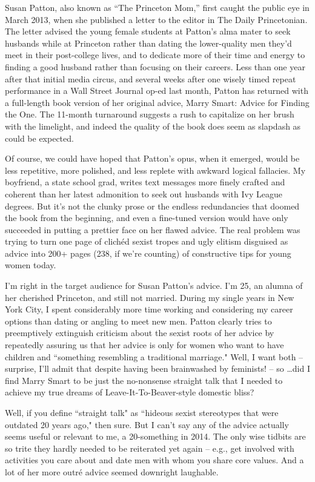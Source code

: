 \bigskip
\begin{linenumbers}
\modulolinenumbers[5]
Susan Patton, also known as “The Princeton Mom,” first caught the public eye in March 2013, when she published a letter to the editor in The Daily Princetonian. The letter advised the young female students at Patton's alma mater to seek husbands while at Princeton rather than dating the lower-quality men they'd meet in their post-college lives, and to dedicate more of their time and energy to finding a good husband rather than focusing on their careers. Less than one year after that initial media circus, and several weeks after one wisely timed repeat performance in a Wall Street Journal op-ed last month, Patton has returned with a full-length book version of her original advice, Marry Smart: Advice for Finding the One. The 11-month turnaround suggests a rush to capitalize on her brush with the limelight, and indeed the quality of the book does seem as slapdash as could be expected.

\indent Of course, we could have hoped that Patton's opus, when it emerged, would be less repetitive, more polished, and less replete with awkward logical fallacies. My boyfriend, a state school grad, writes text messages more finely crafted and coherent than her latest admonition to seek out husbands with Ivy League degrees. But it's not the clunky prose or the endless redundancies that doomed the book from the beginning, and even a fine-tuned version would have only succeeded in putting a prettier face on her flawed advice. The real problem was trying to turn one page of clichéd sexist tropes and ugly elitism disguised as advice into 200+ pages (238, if we're counting) of constructive tips for young women today.

\indent I'm right in the target audience for Susan Patton's advice. I'm 25, an alumna of her cherished Princeton, and still not married. During my single years in New York City, I spent considerably more time working and considering my career options than dating or angling to meet new men. Patton clearly tries to preemptively extinguish criticism about the sexist roots of her advice by repeatedly assuring us that her advice is only for women who want to have children and ``something resembling a traditional marriage." Well, I want both -- surprise, I'll admit that despite having been brainwashed by feminists! -- so \ldots did I find Marry Smart to be just the no-nonsense straight talk that I needed to achieve my true dreams of Leave-It-To-Beaver-style domestic bliss?

\indent Well, if you define ``straight talk" as ``hideous sexist stereotypes that were outdated 20 years ago," then sure. But I can't say any of the advice actually seems useful or relevant to me, a 20-something in 2014. The only wise tidbits are so trite they hardly needed to be reiterated yet again -- e.g., get involved with activities you care about and date men with whom you share core values. And a lot of her more outr\'e advice seemed downright laughable.
\end{linenumbers}

